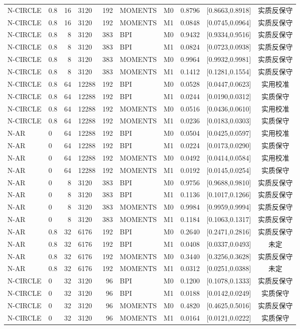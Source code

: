 \documentclass[UTF8,zihao=-4]{ctexart}
\theoremstyle{remark}
\begin{document}
\begin{longtable}{llrlrlrrc c}
N-CIRCLE & 0.8 & 16 & 3120 & 192 & MOMENTS & M0 & 0.8796 & [0.8663,0.8918] & 实质反保守\\
N-CIRCLE & 0.8 & 16 & 3120 & 192 & MOMENTS & M1 & 0.0848 & [0.0745,0.0964] & 实质反保守\\
N-CIRCLE & 0.8 & 8 & 3120 & 383 & BPI & M0 & 0.9432 & [0.9334,0.9516] & 实质反保守\\
N-CIRCLE & 0.8 & 8 & 3120 & 383 & BPI & M1 & 0.0824 & [0.0723,0.0938] & 实质反保守\\
N-CIRCLE & 0.8 & 8 & 3120 & 383 & MOMENTS & M0 & 0.9964 & [0.9932,0.9981] & 实质反保守\\
N-CIRCLE & 0.8 & 8 & 3120 & 383 & MOMENTS & M1 & 0.1412 & [0.1281,0.1554] & 实质反保守\\
N-CIRCLE & 0.8 & 64 & 12288 & 192 & BPI & M0 & 0.0528 & [0.0447,0.0623] & 实用校准\\
N-CIRCLE & 0.8 & 64 & 12288 & 192 & BPI & M1 & 0.0244 & [0.0190,0.0312] & 实质保守\\
N-CIRCLE & 0.8 & 64 & 12288 & 192 & MOMENTS & M0 & 0.0516 & [0.0436,0.0610] & 实用校准\\
N-CIRCLE & 0.8 & 64 & 12288 & 192 & MOMENTS & M1 & 0.0236 & [0.0183,0.0303] & 实质保守\\
N-AR & 0 & 64 & 12288 & 192 & BPI & M0 & 0.0504 & [0.0425,0.0597] & 实用校准\\
N-AR & 0 & 64 & 12288 & 192 & BPI & M1 & 0.0224 & [0.0173,0.0290] & 实质保守\\
N-AR & 0 & 64 & 12288 & 192 & MOMENTS & M0 & 0.0492 & [0.0414,0.0584] & 实用校准\\
N-AR & 0 & 64 & 12288 & 192 & MOMENTS & M1 & 0.0192 & [0.0145,0.0254] & 实质保守\\
N-AR & 0 & 8 & 3120 & 383 & BPI & M0 & 0.9756 & [0.9688,0.9810] & 实质反保守\\
N-AR & 0 & 8 & 3120 & 383 & BPI & M1 & 0.1136 & [0.1017,0.1266] & 实质反保守\\
N-AR & 0 & 8 & 3120 & 383 & MOMENTS & M0 & 0.9984 & [0.9959,0.9994] & 实质反保守\\
N-AR & 0 & 8 & 3120 & 383 & MOMENTS & M1 & 0.1184 & [0.1063,0.1317] & 实质反保守\\
N-AR & 0.8 & 32 & 6176 & 192 & BPI & M0 & 0.2640 & [0.2471,0.2816] & 实质反保守\\
N-AR & 0.8 & 32 & 6176 & 192 & BPI & M1 & 0.0408 & [0.0337,0.0493] & 未定\\
N-AR & 0.8 & 32 & 6176 & 192 & MOMENTS & M0 & 0.3440 & [0.3256,0.3628] & 实质反保守\\
N-AR & 0.8 & 32 & 6176 & 192 & MOMENTS & M1 & 0.0312 & [0.0251,0.0388] & 未定\\
N-CIRCLE & 0 & 32 & 3120 & 96 & BPI & M0 & 0.1200 & [0.1078,0.1333] & 实质反保守\\
N-CIRCLE & 0 & 32 & 3120 & 96 & BPI & M1 & 0.0188 & [0.0142,0.0249] & 实质保守\\
N-CIRCLE & 0 & 32 & 3120 & 96 & MOMENTS & M0 & 0.4820 & [0.4625,0.5016] & 实质反保守\\
N-CIRCLE & 0 & 32 & 3120 & 96 & MOMENTS & M1 & 0.0164 & [0.0121,0.0222] & 实质保守\\
\bottomrule
\end{longtable}
\endgroup
\end{document}
